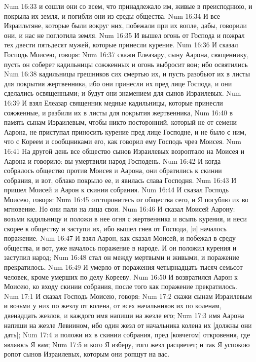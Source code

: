 Num 16:33  и сошли они со всем, что принадлежало им, живые в преисподнюю, и покрыла их земля, и погибли они из среды общества.
Num 16:34  И все Израильтяне, которые были вокруг них, побежали при их вопле, дабы, говорили они, и нас не поглотила земля.
Num 16:35  И вышел огонь от Господа и пожрал тех двести пятьдесят мужей, которые принесли курение.
Num 16:36  И сказал Господь Моисею, говоря:
Num 16:37  скажи Елеазару, сыну Аарона, священнику, пусть он соберет кадильницы сожженных и огонь выбросит вон; ибо освятились
Num 16:38  кадильницы грешников сих смертью их, и пусть разобьют их в листы для покрытия жертвенника, ибо они принесли их пред лице Господа, и они сделались освященными; и будут они знамением для сынов Израилевых.
Num 16:39  И взял Елеазар священник медные кадильницы, которые принесли сожженные, и разбили их в листы для покрытия жертвенника,
Num 16:40  в память сынам Израилевым, чтобы никто посторонний, который не от семени Аарона, не приступал приносить курение пред лице Господне, и не было с ним, что с Кореем и сообщниками его, как говорил ему Господь чрез Моисея.
Num 16:41  На другой день все общество сынов Израилевых возроптало на Моисея и Аарона и говорило: вы умертвили народ Господень.
Num 16:42  И когда собралось общество против Моисея и Аарона, они обратились к скинии собрания, и вот, облако покрыло ее, и явилась слава Господня.
Num 16:43  И пришел Моисей и Аарон к скинии собрания.
Num 16:44  И сказал Господь Моисею, говоря:
Num 16:45  отсторонитесь от общества сего, и Я погублю их во мгновение. Но они пали на лица свои.
Num 16:46  И сказал Моисей Аарону: возьми кадильницу и положи в нее огня с жертвенника и всыпь курения, и неси скорее к обществу и заступи их, ибо вышел гнев от Господа, [и] началось поражение.
Num 16:47  И взял Аарон, как сказал Моисей, и побежал в среду общества, и вот, уже началось поражение в народе. И он положил курения и заступил народ;
Num 16:48  стал он между мертвыми и живыми, и поражение прекратилось.
Num 16:49  И умерло от поражения четырнадцать тысяч семьсот человек, кроме умерших по делу Корееву.
Num 16:50  И возвратился Аарон к Моисею, ко входу скинии собрания, после того как поражение прекратилось.
Num 17:1  И сказал Господь Моисею, говоря:
Num 17:2  скажи сынам Израилевым и возьми у них по жезлу от колена, от всех начальников их по коленам, двенадцать жезлов, и каждого имя напиши на жезле его;
Num 17:3  имя Аарона напиши на жезле Левиином, ибо один жезл от начальника колена их [должны они дать];
Num 17:4  и положи их в скинии собрания, пред [ковчегом] откровения, где являюсь Я вам;
Num 17:5  и кого Я изберу, того жезл расцветет; и так Я успокою ропот сынов Израилевых, которым они ропщут на вас.
